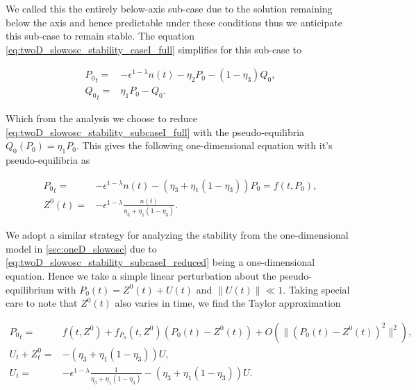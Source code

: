 We called this the entirely below-axis sub-case due to the solution remaining below the axis and hence predictable under these conditions thus we anticipate this sub-case to remain stable. The equation \eqref{eq:twoD_slowosc_stability_caseI_full} simplifies for this sub-case to

\begin{equation}\label{eq:twoD_slowosc_stability_subcaseI_full}
\begin{aligned}
{P_0}_t =& -\epsilon^{1-\lambda} n(t)-\eta_2 P_0 -(1-\eta_3)Q_0,\\
{Q_0}_t =& \eta_1 P_0 - Q_0.
\end{aligned}
\end{equation}

Which from the analysis we choose to reduce \eqref{eq:twoD_slowosc_stability_subcaseI_full} with the pseudo-equilibria $Q_0(P_0)=\eta_1 P_0$. This gives the following one-dimensional equation with it's pseudo-equilibria as 

\begin{equation}\label{eq:twoD_slowosc_stability_subcaseI_reduced}
\begin{aligned}
{P_0}_t =& -\epsilon^{1-\lambda}n(t)-(\eta_3+\eta_1(1-\eta_3))P_0=f(t,P_0),\\ Z^0(t) =& -\epsilon^{1-\lambda}\frac{n(t)}{\eta_3+\eta_1(1-\eta_3)}.
\end{aligned}
\end{equation}

We adopt a similar strategy for analyzing the stability from the one-dimensional model in \autoref{sec:oneD_slowosc} due to \eqref{eq:twoD_slowosc_stability_subcaseI_reduced} being a one-dimensional equation. Hence we take a simple linear perturbation about the pseudo-equilibrium with $P_0(t)=Z^0(t)+U(t)$ and $\lVert U(t)\rVert \ll 1$. Taking special care to note that $Z^0(t)$ also varies in time, we find the Taylor approximation

\begin{equation}\label{eq:twoD_slowosc_subcaseI_perturb}
\begin{aligned}
{P_0}_t=&f(t,Z^0) +f_{P_0}(t,Z^0)(P_0(t)-Z^0(t))+O(\lVert (P_0(t)-Z^0(t))^2\rVert^2),\\
U_t+Z^0_t =& -(\eta_3+\eta_1(1-\eta_3))U,\\
U_t =& -\epsilon^{1-\lambda}\frac{1}{\eta_3+\eta_1(1-\eta_3)}-(\eta_3+\eta_1(1-\eta_3))U.
\end{aligned}
\end{equation}

